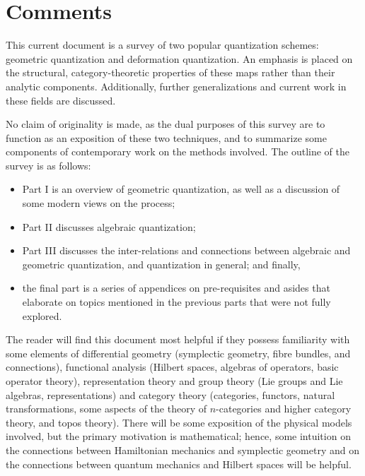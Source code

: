 \section{Comments}
This current document is a survey of two popular quantization schemes: geometric quantization and deformation quantization. An emphasis is placed on the structural, category-theoretic properties of these maps rather than their analytic components. Additionally, further generalizations and current work in these fields are discussed.

No claim of originality is made, as the dual purposes of this survey are to function as an exposition of these two techniques, and to summarize some components of contemporary work on the methods involved. The outline of the survey is as follows:
\begin{itemize}
\item Part I is an overview of geometric quantization, as well as a discussion of some modern views on the process;
\item Part II discusses algebraic quantization;
\item Part III discusses the inter-relations and connections between algebraic and geometric quantization, and quantization in general; and finally,
\item the final part is a series of appendices on pre-requisites and asides that elaborate on topics mentioned in the previous parts that were not fully explored.
\end{itemize}
 
The reader will find this document most helpful if they possess familiarity with some elements of differential geometry (symplectic geometry, fibre bundles, and connections), functional analysis (Hilbert spaces, algebras of operators, basic operator theory), representation theory and group theory (Lie groups and Lie algebras, representations) and category theory (categories, functors, natural transformations, some aspects of the theory of $n$-categories and higher category theory, and topos theory). There will be some exposition of the physical models involved, but the primary motivation is mathematical; hence, some intuition on the connections between Hamiltonian mechanics and symplectic geometry and on the connections between quantum mechanics and Hilbert spaces will be helpful.

